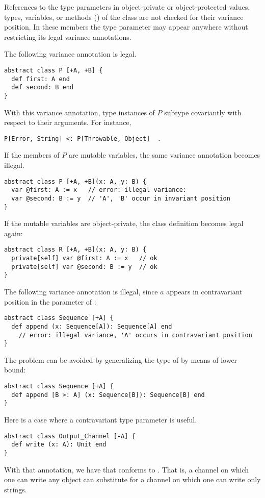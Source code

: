 References to the type parameters in object-private or object-protected values, types, variables, or methods () of the class are not checked for their variance position. In these members the type parameter may appear anywhere without restricting its legal variance annotations. 

\example The following variance annotation is legal. 
\begin{lstlisting}
abstract class P [+A, +B] {
  def first: A end
  def second: B end
}
\end{lstlisting}
With this variance annotation, type instances of $P$ subtype covariantly with respect to their arguments. For instance, 
\begin{lstlisting}
P[Error, String] <: P[Throwable, Object]  .
\end{lstlisting}
If the members of $P$ are mutable variables, the same variance annotation becomes illegal. 
\begin{lstlisting}
abstract class P [+A, +B](x: A, y: B) {
  var @first: A := x   // error: illegal variance:
  var @second: B := y  // 'A', 'B' occur in invariant position
}
\end{lstlisting}
If the mutable variables are object-private, the class definition becomes legal again: 
\begin{lstlisting}
abstract class R [+A, +B](x: A, y: B) {
  private[self] var @first: A := x   // ok
  private[self] var @second: B := y  // ok
}
\end{lstlisting}

\example The following variance annotation is illegal, since $a$ appears in contravariant position in the parameter of :
\begin{lstlisting}
abstract class Sequence [+A] {
  def append (x: Sequence[A]): Sequence[A] end
    // error: illegal variance, 'A' occurs in contravariant position
}
\end{lstlisting}
The problem can be avoided by generalizing the type of  by means of lower bound:
\begin{lstlisting}
abstract class Sequence [+A] {
  def append [B >: A] (x: Sequence[B]): Sequence[B] end
}
\end{lstlisting}

\example Here is a case where a contravariant type parameter is useful. 
\begin{lstlisting}
abstract class Output_Channel [-A] {
  def write (x: A): Unit end
}
\end{lstlisting}
With that annotation, we have that  conforms to . That is, a channel on which one can write any object can substitute for a channel on which one can write only strings. 
 





